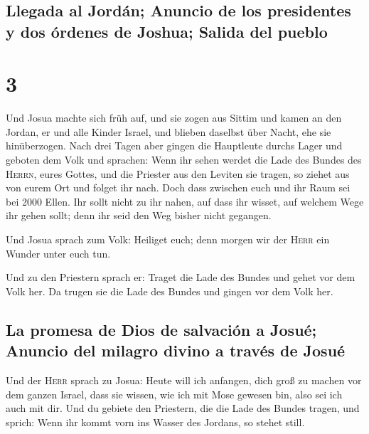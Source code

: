 \hypertarget{llegada-al-jorduxe1n-anuncio-de-los-presidentes-y-dos-uxf3rdenes-de-joshua-salida-del-pueblo}{%
\subsection{Llegada al Jordán; Anuncio de los presidentes y dos órdenes
de Joshua; Salida del
pueblo}\label{llegada-al-jorduxe1n-anuncio-de-los-presidentes-y-dos-uxf3rdenes-de-joshua-salida-del-pueblo}}

\hypertarget{section-2}{%
\section{3}\label{section-2}}

 Und Josua machte sich früh auf, und sie zogen aus Sittim
und kamen an den Jordan, er und alle Kinder Israel, und blieben daselbst
über Nacht, ehe sie hinüberzogen.  Nach drei Tagen aber
gingen die Hauptleute durchs Lager  und geboten dem Volk
und sprachen: Wenn ihr sehen werdet die Lade des Bundes des
\textsc{Herrn}, eures Gottes, und die Priester aus den Leviten sie
tragen, so ziehet aus von eurem Ort und folget ihr nach. 
Doch dass zwischen euch und ihr Raum sei bei 2000 Ellen. Ihr sollt nicht
zu ihr nahen, auf dass ihr wisset, auf welchem Wege ihr gehen sollt;
denn ihr seid den Weg bisher nicht gegangen.

 Und Josua sprach zum Volk: Heiliget euch; denn morgen wir
der \textsc{Herr} ein Wunder unter euch tun.

 Und zu den Priestern sprach er: Traget die Lade des
Bundes und gehet vor dem Volk her. Da trugen sie die Lade des Bundes und
gingen vor dem Volk her.

\hypertarget{la-promesa-de-dios-de-salvaciuxf3n-a-josuuxe9-anuncio-del-milagro-divino-a-travuxe9s-de-josuuxe9}{%
\subsection{La promesa de Dios de salvación a Josué; Anuncio del milagro
divino a través de
Josué}\label{la-promesa-de-dios-de-salvaciuxf3n-a-josuuxe9-anuncio-del-milagro-divino-a-travuxe9s-de-josuuxe9}}

 Und der \textsc{Herr} sprach zu Josua: Heute will ich
anfangen, dich groß zu machen vor dem ganzen Israel, dass sie wissen,
wie ich mit Mose gewesen bin, also sei ich auch mit dir. 
Und du gebiete den Priestern, die die Lade des Bundes tragen, und
sprich: Wenn ihr kommt vorn ins Wasser des Jordans, so stehet still.

